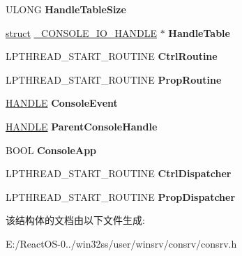 \begin{DoxyCompactItemize}
U\+L\+O\+NG {\bfseries Handle\+Table\+Size}
\item 
\mbox{\label{struct___c_o_n_s_o_l_e___p_r_o_c_e_s_s___d_a_t_a_af0315fe468184da03c46451bde40c00d}} 
\hyperlink{interfacestruct}{struct} \hyperlink{struct___c_o_n_s_o_l_e___i_o___h_a_n_d_l_e}{\+\_\+\+C\+O\+N\+S\+O\+L\+E\+\_\+\+I\+O\+\_\+\+H\+A\+N\+D\+LE} $\ast$ {\bfseries Handle\+Table}
\item 
\mbox{\label{struct___c_o_n_s_o_l_e___p_r_o_c_e_s_s___d_a_t_a_a169d6925650be2ab4060363bd56a79cd}} 
L\+P\+T\+H\+R\+E\+A\+D\+\_\+\+S\+T\+A\+R\+T\+\_\+\+R\+O\+U\+T\+I\+NE {\bfseries Ctrl\+Routine}
\item 
\mbox{\label{struct___c_o_n_s_o_l_e___p_r_o_c_e_s_s___d_a_t_a_acf5c52ace258046942f3717733da7051}} 
L\+P\+T\+H\+R\+E\+A\+D\+\_\+\+S\+T\+A\+R\+T\+\_\+\+R\+O\+U\+T\+I\+NE {\bfseries Prop\+Routine}
\item 
\mbox{\label{struct___c_o_n_s_o_l_e___p_r_o_c_e_s_s___d_a_t_a_a077641fc0f686f0c9fc18f1b4a17e454}} 
\hyperlink{interfacevoid}{H\+A\+N\+D\+LE} {\bfseries Console\+Event}
\item 
\mbox{\label{struct___c_o_n_s_o_l_e___p_r_o_c_e_s_s___d_a_t_a_a5a1958a19263a1a11b258d99685785b1}} 
\hyperlink{interfacevoid}{H\+A\+N\+D\+LE} {\bfseries Parent\+Console\+Handle}
\item 
\mbox{\label{struct___c_o_n_s_o_l_e___p_r_o_c_e_s_s___d_a_t_a_ab9427cf0b043af487367f12d31e418be}} 
B\+O\+OL {\bfseries Console\+App}
\item 
\mbox{\label{struct___c_o_n_s_o_l_e___p_r_o_c_e_s_s___d_a_t_a_af463058338751635199d96196e0cce45}} 
L\+P\+T\+H\+R\+E\+A\+D\+\_\+\+S\+T\+A\+R\+T\+\_\+\+R\+O\+U\+T\+I\+NE {\bfseries Ctrl\+Dispatcher}
\item 
\mbox{\label{struct___c_o_n_s_o_l_e___p_r_o_c_e_s_s___d_a_t_a_aa4d96bc71b4a379be64a9fc870472d72}} 
L\+P\+T\+H\+R\+E\+A\+D\+\_\+\+S\+T\+A\+R\+T\+\_\+\+R\+O\+U\+T\+I\+NE {\bfseries Prop\+Dispatcher}
\end{DoxyCompactItemize}


该结构体的文档由以下文件生成\+:\begin{DoxyCompactItemize}
\item 
E\+:/\+React\+O\+S-\/0../win32ss/user/winsrv/consrv/consrv.\+h\end{DoxyCompactItemize}
